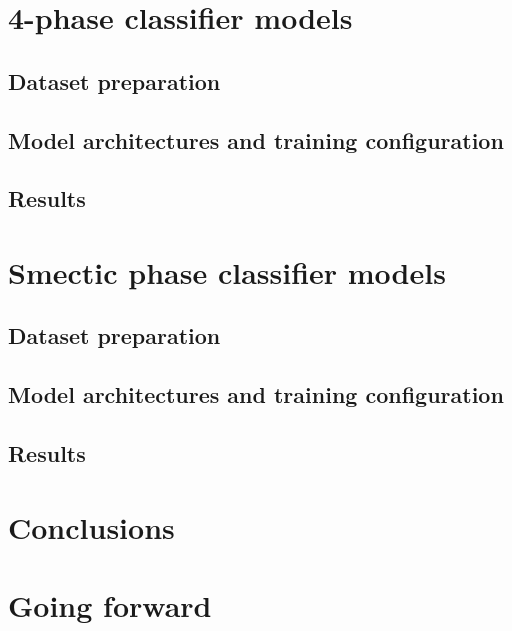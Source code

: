 \documentclass[12pt]{article}
\begin{document}
\section{4-phase classifier models}

\subsection{Dataset preparation}

\subsection{Model architectures and training configuration}

\subsection{Results}

\section{Smectic phase classifier models}

\subsection{Dataset preparation}

\subsection{Model architectures and training configuration}

\subsection{Results}

\section{Conclusions}

\section{Going forward}

\nocite{*}



\end{document}
